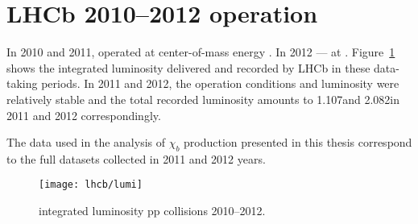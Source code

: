 \section{LHCb 2010--2012 operation}

In 2010 and 2011, \lhcb operated at center-of-mass energy \tev. In 2012
--- at \tev. Figure~\ref{fig:lumi} shows the integrated luminosity
delivered and recorded by LHCb in these data-taking periods. In 2011 and 2012,
the operation conditions and luminosity were relatively stable and the total
recorded luminosity amounts to 1.107\invfb and 2.082\invfb in 2011 and 2012
correspondingly.

The data used in the analysis of $\chi_b$ production presented in this thesis
correspond to the full datasets collected in 2011 and 2012 years.

\begin{figure}[tb]
\begin{center}
\texttt{[image: lhcb/lumi]}
\end{center}
\caption{\small \lhcb integrated luminosity pp collisions 2010--2012.}
\label{fig:lumi}
\end{figure}
